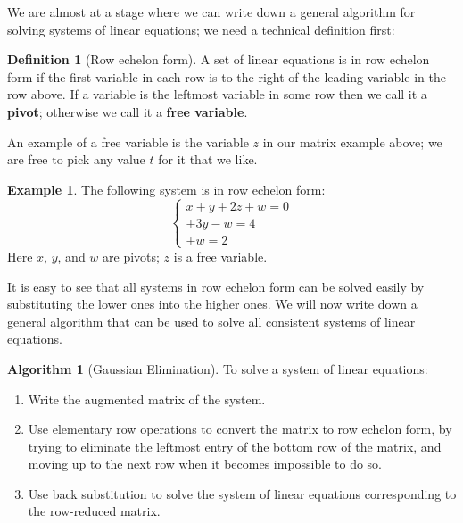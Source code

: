 \documentclass[a4paper,leqno]{article}
\numberwithin{equation}{section}
\theoremstyle{definition}
\newtheorem{defn}[equation]{Definition}
\newtheorem{ex}[equation]{Example}
\newtheorem{alg}[equation]{Algorithm}
\theoremstyle{remark}
\newcommand{\df}[1]{\textbf{#1}}
\begin{document}
We are almost at a stage where we can write down a general algorithm for solving systems of linear equations; we need
a technical definition first:

\begin{defn}[Row echelon form]
  A set of linear equations is in row echelon form if the first variable in each row is to the right of the leading
  variable in the row above. If a variable is the leftmost variable in some row then we call it a \df{pivot}; otherwise
  we call it a \df{free variable}.
\end{defn}

An example of a free variable is the variable $ z $ in our matrix example above; we are free to pick any value $ t $ for it
that we like.

\begin{ex}
  The following system is in row echelon form:
  \begin{equation*}
    \begin{cases}
      x +  y + 2z + w = 0\\
        + 3y      - w = 4\\
                  + w = 2
    \end{cases}
  \end{equation*}
  Here $ x $, $ y $, and $ w $ are pivots; $ z $ is a free variable.
\end{ex}

It is easy to see that all systems in row echelon form can be solved easily by substituting the lower ones
into the higher ones. We will now write down a general algorithm that can be used to solve all consistent
systems of linear equations.
\begin{alg}[Gaussian Elimination]
  To solve a system of linear equations:
  \begin{enumerate}
    \item Write the augmented matrix of the system.
    \item Use elementary row operations to convert the matrix to row echelon form, by trying to eliminate the leftmost entry of the bottom
          row of the matrix, and moving up to the next row when it becomes impossible to do so.
    \item Use back substitution to solve the system of linear equations corresponding to the row-reduced matrix.
  \end{enumerate}
\end{alg}
\end{document}
